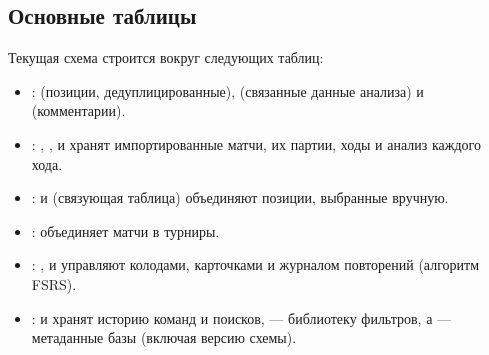 \documentclass[letterpaper,10pt,russian]{sphinxmanual}
\begin{document}
\subsection{Основные таблицы}
\label{\detokenize{annexe_db_scheme:principales-tables}}
\sphinxAtStartPar
Текущая схема строится вокруг следующих таблиц:
\begin{itemize}
\item {} 
\sphinxAtStartPar
{}:  (позиции, дедуплицированные),  (связанные данные анализа) и  (комментарии).

\item {} 
\sphinxAtStartPar
{}: , ,  и  хранят импортированные матчи, их партии, ходы и анализ каждого хода.

\item {} 
\sphinxAtStartPar
{}:  и  (связующая таблица) объединяют позиции, выбранные вручную.

\item {} 
\sphinxAtStartPar
{}:  объединяет матчи в турниры.

\item {} 
\sphinxAtStartPar
{}: ,  и  управляют колодами, карточками и журналом повторений (алгоритм FSRS).

\item {} 
\sphinxAtStartPar
{}:  и  хранят историю команд и поисков,  — библиотеку фильтров, а  — метаданные базы (включая версию схемы).

\end{itemize}
\end{document}
